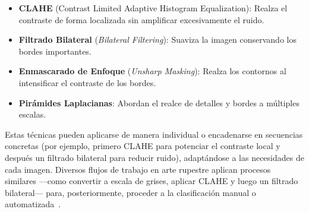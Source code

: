 \begin{itemize}
\item \textbf{CLAHE} (Contrast Limited Adaptive Histogram Equalization): Realza el contraste de forma localizada sin amplificar excesivamente el ruido.
\item \textbf{Filtrado Bilateral} (\textit{Bilateral Filtering}): Suaviza la imagen conservando los bordes importantes.
\item \textbf{Enmascarado de Enfoque} (\textit{Unsharp Masking}): Realza los contornos al intensificar el contraste de los bordes.
\item \textbf{Pirámides Laplacianas}: Abordan el realce de detalles y bordes a múltiples escalas.
\end{itemize}

Estas técnicas pueden aplicarse de manera individual o encadenarse en secuencias concretas (por ejemplo, primero CLAHE para potenciar el contraste local y después un filtrado bilateral para reducir ruido), adaptándose a las necesidades de cada imagen. Diversos flujos de trabajo en arte rupestre aplican procesos similares —como convertir a escala de grises, aplicar CLAHE y luego un filtrado bilateral— para, posteriormente, proceder a la clasificación manual o automatizada~\cite{xiao2020,li2022}.

